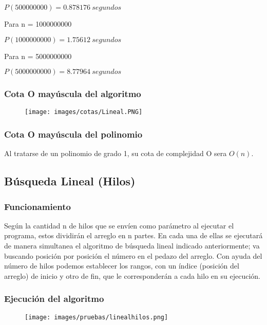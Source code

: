 \documentclass[12pt]{article}
\begin{document}
    			$P(500000000) = 0.878176~ segundos$
    			
    			Para n = 1000000000
    			
    			$P(1000000000) = 1.75612~ segundos$
    			
    			Para n = 5000000000
    			
    			$P(5000000000) = 8.77964~ segundos$
    
    		\subsubsection{Cota O mayúscula del algoritmo}

			\begin{figure}[H]
			    	   \centering
			    	   \texttt{[image: images/cotas/Lineal.PNG]}
			    \end{figure}
			    
			    \subsubsection{Cota O mayúscula del polinomio}
			    Al tratarse de un polinomio de grado 1, su cota de complejidad O sera $O(n)$.
			    

    		  
	
\newpage


		\subsection{Búsqueda Lineal (Hilos)}
			
			\subsubsection{Funcionamiento}
			Según la cantidad n de hilos que se envíen como parámetro al ejecutar el programa, estos dividirán el arreglo en n partes. En cada una de ellas se ejecutará de manera simultanea el algoritmo de búsqueda lineal indicado anteriormente; va buscando posición por posición el número en el pedazo del arreglo. Con ayuda del número de hilos podemos establecer los rangos, con un índice (posición del arreglo) de inicio y otro de fin, que le corresponderán a cada hilo en su ejecución.
			
			\subsubsection{Ejecución del algoritmo}
				\begin{figure}[H]
			    	   \centering
			    	   \texttt{[image: images/pruebas/linealhilos.png]}
			    \end{figure}
			
\end{document}
